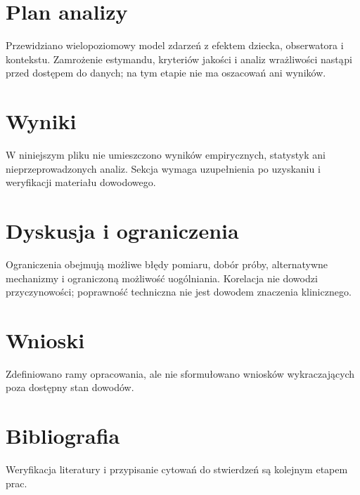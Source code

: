 \documentclass[11pt,a4paper]{article}
\begin{document}
\section{Plan analizy}

Przewidziano wielopoziomowy model zdarzeń z efektem dziecka, obserwatora i kontekstu. Zamrożenie estymandu, kryteriów jakości i analiz wrażliwości nastąpi przed dostępem do danych; na tym etapie nie ma oszacowań ani wyników.

\section{Wyniki}

W niniejszym pliku nie umieszczono wyników empirycznych, statystyk ani nieprzeprowadzonych analiz. Sekcja wymaga uzupełnienia po uzyskaniu i weryfikacji materiału dowodowego.

\section{Dyskusja i ograniczenia}

Ograniczenia obejmują możliwe błędy pomiaru, dobór próby, alternatywne mechanizmy i ograniczoną możliwość uogólniania. Korelacja nie dowodzi przyczynowości; poprawność techniczna nie jest dowodem znaczenia klinicznego.

\section{Wnioski}

Zdefiniowano ramy opracowania, ale nie sformułowano wniosków wykraczających poza dostępny stan dowodów.

\section*{Bibliografia}

Weryfikacja literatury i przypisanie cytowań do stwierdzeń są kolejnym etapem prac.
\end{document}
